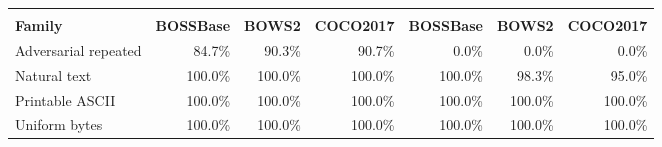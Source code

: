 \begin{tabular}{lrrrrrr}
\toprule
&  &  \\
\textbf{Family} & \textbf{BOSSBase} & \textbf{BOWS2} & \textbf{COCO2017} & \textbf{BOSSBase} & \textbf{BOWS2} & \textbf{COCO2017} \\
\midrule
Adversarial repeated & 84.7\% & 90.3\% & 90.7\% & 0.0\% & 0.0\% & 0.0\% \\
Natural text & 100.0\% & 100.0\% & 100.0\% & 100.0\% & 98.3\% & 95.0\% \\
Printable ASCII & 100.0\% & 100.0\% & 100.0\% & 100.0\% & 100.0\% & 100.0\% \\
Uniform bytes & 100.0\% & 100.0\% & 100.0\% & 100.0\% & 100.0\% & 100.0\% \\
\bottomrule
\end{tabular}
